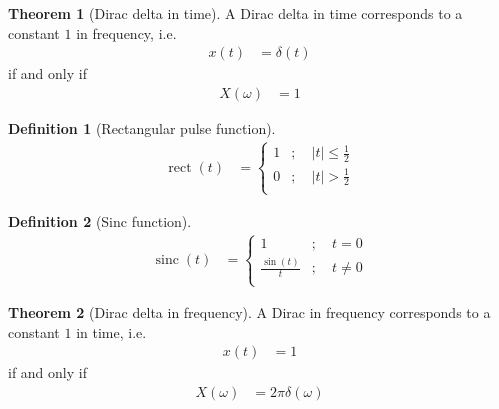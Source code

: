 \documentclass[titlepage, fleqn, a4paper, 12pt, twoside]{article}
\theoremstyle{definition}
\newtheorem{definition}{Definition}
\theoremstyle{theorem}
\newtheorem{theorem}{Theorem}
\DeclareMathOperator{\sinc}{\mathrm{sinc}}
\DeclareMathOperator{\rect}{\mathrm{rect}}
\begin{document}
\begin{theorem}[Dirac delta in time]
	A Dirac delta in time corresponds to a constant $1$ in frequency, i.e.
	\begin{align*}
		x(t) &= \delta(t)
	\end{align*}
	if and only if
	\begin{align*}
		X(\omega) &= 1
	\end{align*}
	\label{thm:Dirac_delta_in_time}
\end{theorem}

\begin{definition}[Rectangular pulse function]
	\begin{align*}
		\rect(t) &=
			\begin{cases}
				1 &;\quad |t| \le \frac{1}{2}\\
				0 &;\quad |t| > \frac{1}{2}\\
			\end{cases}
	\end{align*}
	\label{def:rect_function}
\end{definition}

\begin{definition}[Sinc function]
	\begin{align*}
		\sinc(t) &=
			\begin{cases}
				1 &;\quad t = 0\\
				\frac{\sin(t)}{t} &;\quad t \neq 0\\
			\end{cases}
	\end{align*}
	\label{def:sinc_function}
\end{definition}

\begin{theorem}[Dirac delta in frequency]
	A Dirac in frequency corresponds to a constant $1$ in time, i.e.
	\begin{align*}
		x(t) &= 1
	\end{align*}
	if and only if
	\begin{align*}
		X(\omega) &= 2 \pi \delta(\omega)
	\end{align*}
	\label{thm:Dirac_delta_in_frequency}
\end{theorem}
\end{document}
